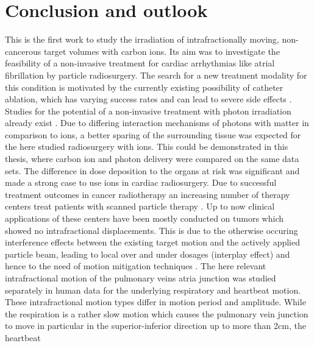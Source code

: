 \documentclass[type=dr, dr=rernat, accentcolor=tud7b,colorbacktitle, bigchapter, openright, twoside, 12pt ]{tudthesis}
\begin{document}
\chapter{Conclusion and outlook}

This is the first work to study the irradiation of intrafractionally moving, non-cancerous target volumes with carbon ions. Its aim was to 
investigate the feasibility of a non-invasive treatment for cardiac arrhythmias like atrial fibrillation by 
particle radiosurgery. \newline
\newline
The search for a new treatment modality for this condition is motivated by the currently existing possibility of 
catheter ablation, which has varying success rates and can lead to severe side effects \cite{Cap05} \cite{Cap10} \cite{Jong05} \cite{Her13} 
\cite{Gai10} \cite{Med13}. Studies for the potential of a non-invasive treatment with photon irradiation already exist \cite{Sha10}. 
Due to differing interaction mechanisms of photons with matter in comparison to ions, a better sparing of the surrounding tissue was 
expected for the here studied radiosurgery with ions. This could be demonstrated in this thesis, where carbon ion and photon delivery were 
compared on the same data sets. The difference in dose deposition to the organs at risk was significant and made a strong case to use ions in 
cardiac radiosurgery.\newline  
\newline
Due to successful treatment outcomes in cancer radiotherapy an increasing number of therapy centers treat patients with scanned particle 
therapy \cite{PTCOG13}. Up to now clinical applications of these centers have been mostly conducted on tumors which showed no 
intrafractional displacements. This is due to the otherwise occuring interference effects between the existing target motion and 
the actively applied particle beam, leading to local over and under dosages (interplay effect) and hence to the need of motion mitigation 
techniques \cite{Phi92} \cite{Ber08}.\newline
\newline
The here relevant intrafractional motion of the pulmonary veins atria junction was studied separately in human data for the underlying 
respiratory and heartbeat motion. These intrafractional motion types differ in motion period and amplitude. While the respiration is a rather 
slow motion which causes the pulmonary vein junction to move in particular in the superior-inferior direction up to more than 2cm, the heartbeat 
\end{document}
